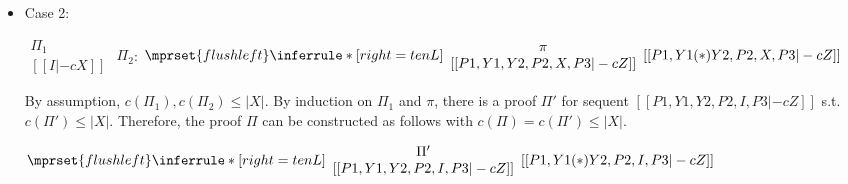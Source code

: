 \begin{itemize}
\item Case 2:
      \begin{center}
        \scriptsize
        \begin{math}
          \begin{array}{c}
            \Pi_1 \\
            {[[I |-c X]]}
          \end{array}
        \end{math}
        \qquad\qquad
        $\Pi_2$:
        \begin{math}
          $$\mprset{flushleft}
          \inferrule* [right={\tiny tenL}] {
            {
              \begin{array}{c}
                \pi \\
                {[[P1, Y1, Y2, P2, X, P3 |-c Z]]}
              \end{array}
            }
          }{[[P1, Y1 (*) Y2, P2, X, P3 |-c Z]]}
        \end{math}
      \end{center}
      By assumption, $c(\Pi_1),c(\Pi_2)\leq |X|$. By induction on $\Pi_1$
      and $\pi$, there is a proof $\Pi'$ for sequent
      $[[P1, Y1, Y2, P2, I, P3 |-c Z]]$ s.t. $c(\Pi') \leq |X|$. Therefore,
      the proof $\Pi$ can be constructed as follows with
      $c(\Pi) = c(\Pi') \leq |X|$.
      \begin{center}
        \scriptsize
        \begin{math}
          $$\mprset{flushleft}
          \inferrule* [right={\tiny tenL}] {
            {
              \begin{array}{c}
                \Pi' \\
                {[[P1, Y1, Y2, P2, I, P3 |-c Z]]}
              \end{array}
            }
          }{[[P1, Y1 (*) Y2, P2, I, P3 |-c Z]]}
        \end{math}
      \end{center}


\end{itemize}
